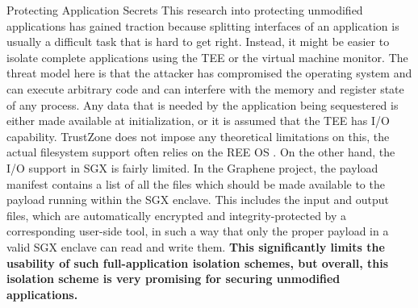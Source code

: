 \begin{subsection}{Protecting Application Secrets}
This research into protecting unmodified applications has gained traction
because splitting interfaces of an application is usually a difficult task that
is hard to get right. Instead, it might be easier to isolate complete
applications using the TEE or the virtual machine monitor. The threat model here
is that the attacker has compromised the operating system and can execute
arbitrary code and can interfere with the memory and register state of any
process. Any data that is needed by the application being sequestered is either
made available at initialization, or it is assumed that the TEE has I/O
capability. TrustZone does not impose any theoretical limitations on this, the
actual filesystem support often relies on the REE OS \cite{optee_filesystem}. On
the other hand, the I/O support in SGX is fairly limited. In the Graphene
project\cite{TsaiGraphene2014, tsai2017graphene}, the payload manifest contains
a list of all the files which should be made available to the payload running
within the SGX enclave. This includes the input and output files, which are
automatically encrypted and integrity-protected by a corresponding user-side
tool, in such a way that only the proper payload in a valid SGX enclave can read
and write them. \textbf{This significantly limits the usability of such
full-application isolation schemes, but overall, this isolation scheme is very
promising for securing unmodified applications.}
    
   
\end{subsection}

